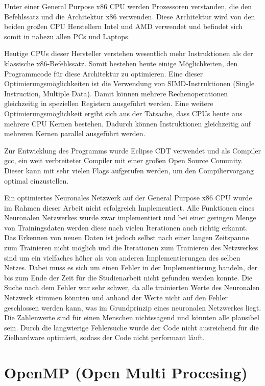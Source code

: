 \documentclass[../main.tex]{subfiles}
\begin{document}
Unter einer General Purpose x86 CPU werden Prozessoren verstanden, die den Befehlssatz und die Architektur x86 verwenden. Diese Architektur wird von den beiden großen CPU Herstellern Intel und AMD verwendet und befindet sich somit in nahezu allen PCs und Laptops. 

Heutige CPUs dieser Hersteller verstehen wesentlich mehr Instruktionen als der klassische x86-Befehlssatz. Somit bestehen heute einige Möglichkeiten, den Programmcode für diese Architektur zu optimieren. Eine dieser Optimierungsmöglichkeiten ist die Verwendung von SIMD-Instruktionen (Single Instruction, Multiple Data). Damit können mehrere Rechenoperationen gleichzeitig in speziellen Registern ausgeführt werden.
Eine weitere Optimierungsmöglichkeit ergibt sich aus der Tatsache,  dass CPUs heute aus mehrere CPU Kernen bestehen. Dadurch können Instruktionen gleichzeitig auf mehreren Kernen parallel ausgeführt werden.

Zur Entwicklung des Programms wurde Eclipse CDT verwendet und als Compiler gcc, ein weit verbreiteter Compiler mit einer großen Open Source Comunity. Dieser kann mit sehr vielen Flags aufgerufen werden, um den Compiliervorgang optimal einzustellen.

Ein optimiertes Neuronales Netzwerk auf der General Purpose x86 CPU wurde im Rahmen dieser Arbeit nicht erfolgreich Implementiert. Alle Funktionen eines Neuronalen Netzwerkes wurde zwar implementiert und bei einer geringen Menge von Trainingsdaten werden diese nach vielen Iterationen auch richtig erkannt. Das Erkennen von neuen Daten ist jedoch selbst nach einer langen Zeitspanne zum Trainieren nicht möglich und die Iterationen zum Trainieren des Netzwerkes sind um ein vielfaches höher als von anderen Implementierungen des selben Netzes. Dabei muss es sich um einen Fehler in der Implementierung handeln, der bis zum Ende der Zeit für die Studienarbeit nicht gefunden werden konnte.
Die Suche nach dem Fehler war sehr schwer, da alle trainierten Werte des Neuronalen Netzwerk stimmen könnten und anhand der Werte nicht auf den Fehler geschlossen werden kann, was im Grundprinzip eines neuronalen Netzwerkes liegt. Die Zahlenwerte sind für einen Menschen nichtssagend und könnten alle plausibel sein.
Durch die langwierige Fehlersuche wurde der Code nicht ausreichend für die Zielhardware optimiert, sodass der Code nicht performant läuft.

\section{OpenMP (Open Multi Procesing)}
\end{document}
